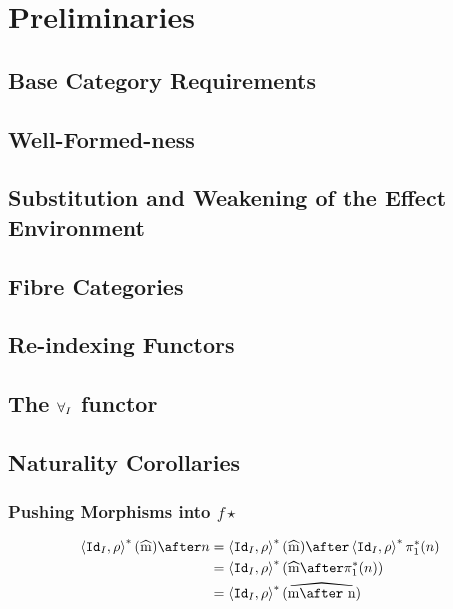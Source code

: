 \documentclass{report}
\begin{document}
\tableofcontents
\chapter{Preliminaries}

\section{Base Category Requirements}
\simplifiedBaseCategory

\section{Well-Formed-ness}
\simplifiedWellFormedNess

\section{Substitution and Weakening of the Effect Environment}
\effectSubsAndWeakening

\section{Fibre Categories}
\simpleFibres

\section{Re-indexing Functors}
\simpleReindexingFunctors

\section{The $\forall_I$ functor}
\allISimple

\section{Naturality Corollaries}
\naturalityLemmas

\subsection{Pushing Morphisms into $f\star$}

\begin{align}
    \pr{\Id{I}}{\rho}\star(\widehat{m})\after n &= \pr{\Id{I}}{\rho}\star(\widehat{m})\after\pr{\Id{I}}{\rho}\star\p\star(n)\\
    & = \pr{\Id{I}}{\rho}\star(\widehat{m}\after\pstar(n))\\
    &= \pr{\Id{I}}{\rho}\star(\widehat{m\after n})
\end{align}
\end{document}
